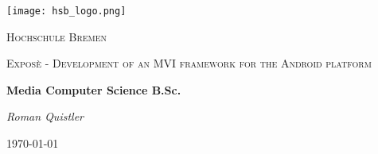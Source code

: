 \begin{titlepage}
	\centering
	\texttt{[image: hsb\_logo.png]}
	\par\vspace{1cm}
	{\scshape\LARGE Hochschule Bremen \par}
	\vspace{1cm}
	{\scshape\Large Exposè - Development of an MVI framework for the Android platform  \par}
	\vspace{1.5cm}
	{\huge\bfseries Media Computer Science B.Sc. \par}
	\vspace{2cm}
	{\Large\itshape Roman Quistler \par}
	\vfill

	\vfill

	{\large \today\par}
\end{titlepage}